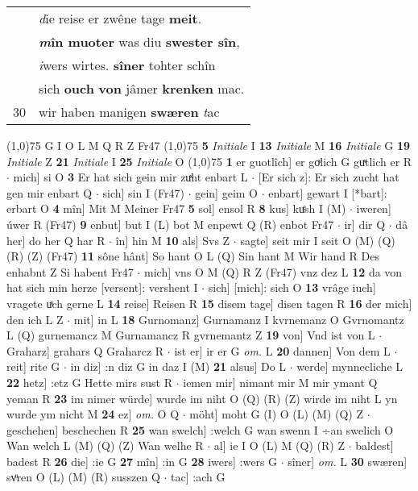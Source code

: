 \documentclass[8pt,a4paper,notitlepage]{article}
\begin{document}
\begin{table}[ht]
\begin{minipage}[t]{0.5\linewidth}
\begin{tabular}{rl}
 & \textit{d}ie reise er zwêne tage \textbf{meit}.\\ 
 & \textbf{\textit{m}în muoter} was diu \textbf{swester sîn},\\ 
 & \textit{i}wers wirtes. \textbf{sîner} tohter schîn\\ 
 & sich \textbf{ouch} \textbf{von} jâmer \textbf{krenken} mac.\\ 
30 & wir haben manigen \textbf{swæren} \textit{t}ac\\ 
\end{tabular}
\scriptsize
\line(1,0){75} \newline
G I O L M Q R Z Fr47 \newline
\line(1,0){75} \newline
\textbf{5} \textit{Initiale} I  \textbf{13} \textit{Initiale} M  \textbf{16} \textit{Initiale} G  \textbf{19} \textit{Initiale} Z  \textbf{21} \textit{Initiale} I  \textbf{25} \textit{Initiale} O  \newline
\line(1,0){75} \newline
\textbf{1} er guotlîch] er goͮlich G guͯtlich er R  $\cdot$ mich] si O \textbf{3} Er hat sich gein mir zuͯht enbart L  $\cdot$ [Er sich z]: Er sich zucht hat gen mir enbart Q  $\cdot$ sich] sin I (Fr47)  $\cdot$ gein] geim O  $\cdot$ enbart] gewart I [*bart]: erbart O \textbf{4} mîn] Mit M Meiner Fr47 \textbf{5} sol] ensol R \textbf{8} kus] kuͤsh I (M)  $\cdot$ iweren] úwer R (Fr47) \textbf{9} enbut] but I (L) bot M enpewt Q (R) enbot Fr47  $\cdot$ ir] dir Q  $\cdot$ dâ her] do her Q har R  $\cdot$ în] hin M \textbf{10} als] Svs Z  $\cdot$ sagte] seit mir I seit O (M) (Q) (R) (Z) (Fr47) \textbf{11} sône hânt] So hant O L (Q) Sin hant M Wir hand R Des enhabnt Z Si habent Fr47  $\cdot$ mich] vns O M (Q) R Z (Fr47) vnz dez L \textbf{12} da von hat sich min herze [versent]: vershent I  $\cdot$ sich] [mich]: sich O \textbf{13} vrâge iuch] vragete uͯch gerne L \textbf{14} reise] Reisen R \textbf{15} disem tage] disen tagen R \textbf{16} der mich] den ich L Z  $\cdot$ mit] in L \textbf{18} Gurnomanz] Gurnamanz I kvrnemanz O Gvrnomantz L (Q) gurnemancz M Gurnamancz R gvrnemantz Z \textbf{19} von] Vnd ist von L  $\cdot$ Graharz] grahars Q Graharcz R  $\cdot$ ist er] ir er G \textit{om.} L \textbf{20} dannen] Von dem L  $\cdot$ reit] rite G  $\cdot$ in diz] :n diz G in daz I (M) \textbf{21} alsus] Do L  $\cdot$ werde] mynnecliche L \textbf{22} hetz] :etz G Hette mirs sust R  $\cdot$ iemen mir] nimant mir M mir ymant Q yeman R \textbf{23} im nimer würde] wurde im niht O (Q) (R) (Z) wirde im niht L yn wurde ym nicht M \textbf{24} ez] \textit{om.} O Q  $\cdot$ möht] moht G (I) O (L) (M) (Q) Z  $\cdot$ geschehen] beschechen R \textbf{25} wan swelch] :welch G wan swenn I ÷an swelich O Wan welch L (M) (Q) (Z) Wan welhe R  $\cdot$ al] ie I O (L) M (Q) (R) Z  $\cdot$ baldest] badest R \textbf{26} die] :ie G \textbf{27} mîn] :in G \textbf{28} iwers] :wers G  $\cdot$ sîner] \textit{om.} L \textbf{30} swæren] svͦren O (L) (M) (R) susszen Q  $\cdot$ tac] :ach G \newline

\end{minipage}
\end{table}
\end{document}
